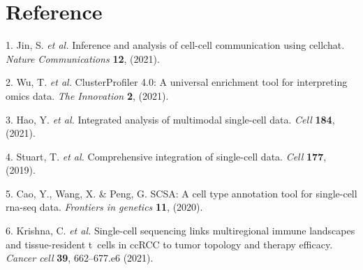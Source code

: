 \documentclass[
]{article}
\newenvironment{cslreferences}%
  {}%
  {\par}
\begin{document}
\hypertarget{bibliography}{%
\section*{Reference}\label{bibliography}}

\hypertarget{refs}{}
\begin{cslreferences}
\leavevmode\hypertarget{ref-InferenceAndAJinS2021}{}%
1. Jin, S. \emph{et al.} Inference and analysis of cell-cell communication using cellchat. \emph{Nature Communications} \textbf{12}, (2021).

\leavevmode\hypertarget{ref-ClusterprofilerWuTi2021}{}%
2. Wu, T. \emph{et al.} ClusterProfiler 4.0: A universal enrichment tool for interpreting omics data. \emph{The Innovation} \textbf{2}, (2021).

\leavevmode\hypertarget{ref-IntegratedAnalHaoY2021}{}%
3. Hao, Y. \emph{et al.} Integrated analysis of multimodal single-cell data. \emph{Cell} \textbf{184}, (2021).

\leavevmode\hypertarget{ref-ComprehensiveIStuart2019}{}%
4. Stuart, T. \emph{et al.} Comprehensive integration of single-cell data. \emph{Cell} \textbf{177}, (2019).

\leavevmode\hypertarget{ref-ScsaACellTyCaoY2020}{}%
5. Cao, Y., Wang, X. \& Peng, G. SCSA: A cell type annotation tool for single-cell rna-seq data. \emph{Frontiers in genetics} \textbf{11}, (2020).

\leavevmode\hypertarget{ref-SingleCellSeqKrishn2021}{}%
6. Krishna, C. \emph{et al.} Single-cell sequencing links multiregional immune landscapes and tissue-resident t~cells in ccRCC to tumor topology and therapy efficacy. \emph{Cancer cell} \textbf{39}, 662--677.e6 (2021).
\end{cslreferences}
\end{document}
